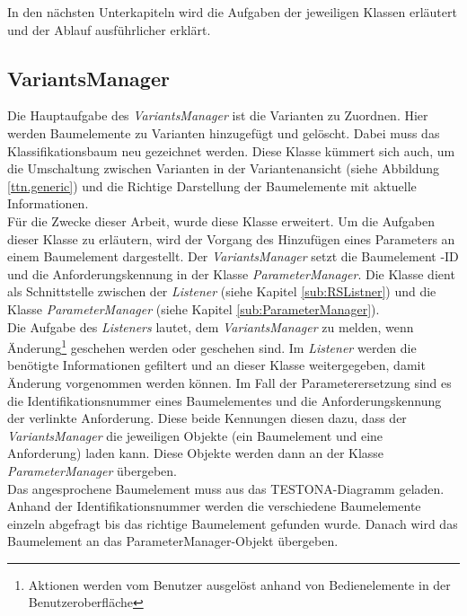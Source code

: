 In den nächsten Unterkapiteln wird die Aufgaben der jeweiligen Klassen erläutert und der Ablauf ausführlicher erklärt.


\subsection{VariantsManager}\label{sub.VariantsManager}
Die Hauptaufgabe des \textit{VariantsManager} ist die Varianten zu Zuordnen. Hier werden Baumelemente zu Varianten hinzugefügt und gelöscht. Dabei muss das Klassifikationsbaum neu gezeichnet werden. Diese Klasse kümmert sich auch, um die Umschaltung zwischen Varianten in der Variantenansicht (siehe Abbildung \ref{ttn.generic}) und die Richtige Darstellung der Baumelemente mit aktuelle Informationen.\\


Für die  Zwecke dieser Arbeit, wurde diese Klasse erweitert. Um die Aufgaben dieser Klasse zu erläutern, wird der Vorgang des Hinzufügen eines Parameters an einem Baumelement dargestellt. Der \textit{VariantsManager} setzt die Baumelement -ID und die Anforderungskennung in der Klasse \textit{ParameterManager}. Die Klasse dient als Schnittstelle zwischen der \textit{Listener} (siehe Kapitel \ref{sub:RSListner}) und die Klasse \textit{ParameterManager}  (siehe Kapitel \ref{sub:ParameterManager}).\\


Die Aufgabe des \textit{Listeners} lautet, dem \textit{VariantsManager} zu melden, wenn Änderung\footnote{Aktionen werden vom Benutzer ausgelöst anhand von Bedienelemente in der Benutzeroberfläche} geschehen werden oder geschehen sind. Im \textit{Listener} werden die benötigte Informationen gefiltert und an dieser Klasse weitergegeben, damit Änderung vorgenommen werden können. Im Fall der Parameterersetzung sind es die Identifikationsnummer eines Baumelementes und die Anforderungskennung der verlinkte Anforderung. Diese beide Kennungen diesen dazu, dass der \textit{VariantsManager} die jeweiligen Objekte (ein Baumelement und eine Anforderung) laden kann. Diese Objekte werden dann an der Klasse \textit{ParameterManager} übergeben.\\


Das angesprochene Baumelement muss aus das TESTONA-Diagramm geladen. Anhand der Identifikationsnummer werden die verschiedene Baumelemente einzeln abgefragt bis das richtige Baumelement gefunden wurde. Danach wird das Baumelement an das ParameterManager-Objekt übergeben.\\


